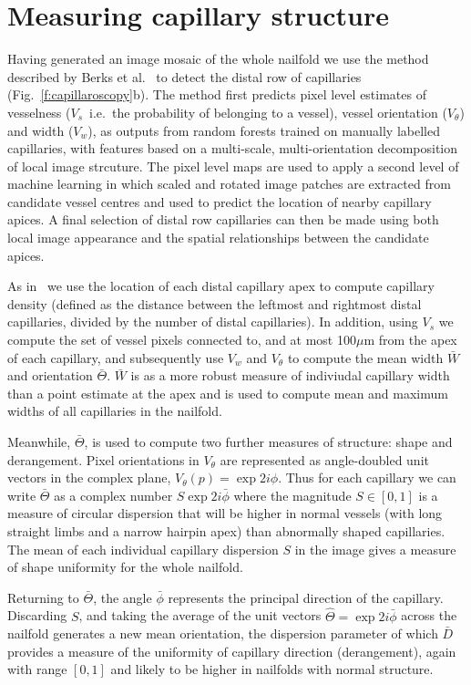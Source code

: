 \documentclass[runningheads,a4paper]{llncs}
\newcommand{\fref}[1]{Fig.~\ref{#1}}
\newcommand*\mean[1]{\bar{#1}}
\def\ie{i.e.}
\begin{document}
\section{Measuring capillary structure}
\label{s:structure}
%
Having generated an image mosaic of the whole nailfold we use the method described by Berks et al.~\cite{Berks_MICCAI14} to detect the distal row of capillaries (\fref{f:capillaroscopy}b). The method first predicts pixel level estimates of vesselness ($V_s$~\ie~the probability of belonging to a vessel), vessel orientation ($V_\theta$) and width ($V_w$), as outputs from random forests trained on manually labelled capillaries, with features based on a multi-scale, multi-orientation decomposition of local image strcuture. The pixel level maps are used to apply a second level of machine learning in which scaled and rotated image patches are extracted from candidate vessel centres and used to predict the location of nearby capillary apices. A final selection of distal row capillaries can then be made using both local image appearance and the spatial relationships between the candidate apices.

As in~\cite{Berks_MICCAI14} we use the location of each distal capillary apex to compute capillary density (defined as the distance between the leftmost and rightmost distal capillaries, divided by the number of distal capillaries). In addition, using $V_s$ we compute the set of vessel pixels connected to, and at most 100$\mu$m from the apex of each capillary, and subsequently use $V_w$ and $V_\theta$ to compute the mean width $\mean{W}$ and orientation $\mean{\Theta}$. $\mean{W}$ is as a more robust measure of indiviudal capillary width than a point estimate at the apex and is used to compute mean and maximum widths of all capillaries in the nailfold. 

Meanwhile, $\mean{\Theta}$, is used  to compute two further measures of structure: shape and derangement. Pixel orientations in $V_\theta$ are represented as angle-doubled unit vectors in the complex plane, $V_\theta(p) = \exp{2i\phi}$. Thus for each capillary  we can write $\mean{\Theta}$ as a complex number $S\exp{2i\mean{\phi}}$ where the magnitude  $S\in[0,1]$ is a measure of circular dispersion that will be higher in normal vessels (with long straight limbs and a narrow hairpin apex) than abnormally shaped capillaries. The mean of each individual capillary dispersion $S$ in the image gives a measure of shape uniformity for the whole nailfold. 

Returning to $\mean{\Theta}$, the angle $\mean{\phi}$ represents the principal direction of the capillary. Discarding $S$, and taking the average of the unit vectors  $\hat{\Theta} = \exp{2i\mean{\phi}}$ across the nailfold generates a new mean orientation, the dispersion parameter of which $\mean{D}$ provides a measure of the uniformity of capillary direction (derangement), again with range $[0,1]$ and likely to be higher in nailfolds with normal structure.
\end{document}
